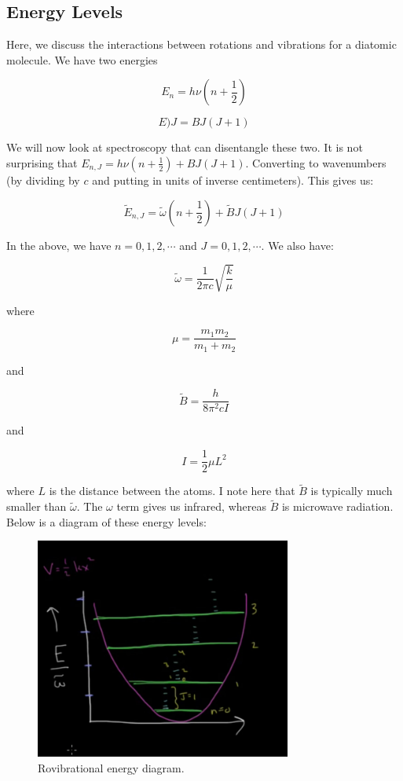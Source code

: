 \documentclass{article}
\newcommand{\be}{\begin{equation}}
\newcommand{\ee}{\end{equation}}
\begin{document}
\subsection{Energy Levels}

Here, we discuss the interactions between rotations and vibrations for a diatomic molecule. We have two energies

\be
E_n = h \nu \left(n + \frac12\right)
\ee

\be
E)J = BJ\left(J+1\right)
\ee

We will now look at spectroscopy that can disentangle these two. It is not surprising that $E_{n,J} = h\nu \left(n + \frac12\right) + BJ\left(J + 1\right)$. Converting to wavenumbers (by dividing by $c$ and putting in units of inverse centimeters). This gives us:

\be
\tilde E _{n,J} = \tilde \omega (n+\frac12) + \tilde B J (J+1)
\ee

In the above, we have $n = 0, 1, 2, \cdots$ and $J = 0, 1, 2, \cdots$. We also have:

\be
\tilde \omega = \frac{1}{2\pi c}\sqrt{\frac{k}{\mu}}
\ee

where

\be
\mu = \frac{m_1 m_2}{m_1 + m_2}
\ee

and 

\be
\tilde B = \frac{h}{8 \pi^2 c I }
\ee

and
 
\be
I = \frac12 \mu L^2
\ee
 
where $L$ is the distance between the atoms. I note here that $\tilde B$ is typically much smaller than $\tilde \omega$. The $\omega$ term gives us infrared, whereas $\tilde B$ is microwave radiation. Below is a diagram of these energy levels:

\begin{figure}
    \centering
    \includegraphics[width=0.75\textwidth]{Screen Shot 2020-09-27 at 6.14.14 PM.png}
    \caption{Rovibrational energy diagram.}
    \label{fig:rovobo}
\end{figure}
\end{document}
